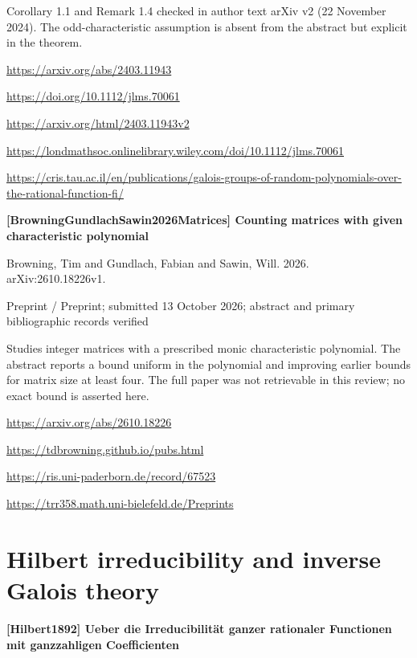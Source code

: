 \documentclass[11pt,a4paper,oneside,openany]{book}
\begin{document}
{\small Corollary 1.1 and Remark 1.4 checked in author text arXiv v2 (22 November 2024). The odd-characteristic assumption is absent from the abstract but explicit in the theorem.}\par
{\footnotesize\url{https://arxiv.org/abs/2403.11943}}\par
{\footnotesize\url{https://doi.org/10.1112/jlms.70061}}\par
{\footnotesize\url{https://arxiv.org/html/2403.11943v2}}\par
{\footnotesize\url{https://londmathsoc.onlinelibrary.wiley.com/doi/10.1112/jlms.70061}}\par
{\footnotesize\url{https://cris.tau.ac.il/en/publications/galois-groups-of-random-polynomials-over-the-rational-function-fi/}}\par
\vspace{9pt}
\hypertarget{ref:BrowningGundlachSawin2026Matrices}{}
{\sffamily\bfseries\color{atlasgreen}[BrowningGundlachSawin2026Matrices] Counting matrices with given characteristic polynomial}\par
\color{black} Browning, Tim and Gundlach, Fabian and Sawin, Will. 2026. arXiv:2610.18226v1.\par
{\small\sffamily\color{atlasgold}Preprint / Preprint; submitted 13 October 2026; abstract and primary bibliographic records verified}\par
\color{black} Studies integer matrices with a prescribed monic characteristic polynomial. The abstract reports a bound uniform in the polynomial and improving earlier bounds for matrix size at least four. The full paper was not retrievable in this review; no exact bound is asserted here.\par
{\footnotesize\url{https://arxiv.org/abs/2610.18226}}\par
{\footnotesize\url{https://tdbrowning.github.io/pubs.html}}\par
{\footnotesize\url{https://ris.uni-paderborn.de/record/67523}}\par
{\footnotesize\url{https://trr358.math.uni-bielefeld.de/Preprints}}\par
\vspace{9pt}
\section{Hilbert irreducibility and inverse Galois theory}
\hypertarget{ref:Hilbert1892}{}
{\sffamily\bfseries\color{atlasgreen}[Hilbert1892] Ueber die Irreducibilität ganzer rationaler Functionen mit ganzzahligen Coefficienten}\par
\end{document}
